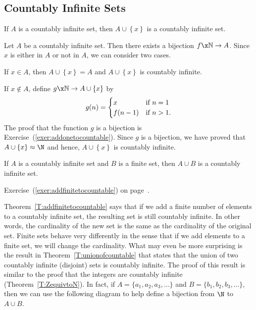\subsection*{Countably Infinite Sets}

\begin{theorem}\label{T:addonetocountable}
If $A$ is a countably infinite set, then $A \cup \left\{ x \right\}$ is a countably infinite set.
\end{theorem}
%
\begin{myproof}
Let $A$ be a  countably infinite set.  Then there exists a bijection $f\x \mathbb{N} \to A$.  Since $x$ is either in $A$ or not in $A$, we can consider two cases.

\newpar
If $x \in A$, then $A \cup \left\{ x \right\} = A$ and $A \cup \left\{ x \right\}$ is countably infinite.

\newpar
If $x \notin A$, define $g\x \mathbb{N} \to A \cup \left\{ x \right\}$ by
\begin{equation} \notag
g( n ) = 
\begin{cases}
x                        &\text{if $n = 1$} \\
f ( n - 1 )   &\text{if $n > 1$.}
\end{cases}
\end{equation}
The proof that the function $g$ is a bijection is Exercise~(\ref{exer:addonetocountable}).  Since $g$ is a bijection, we have proved that $A \cup \left\{ x \right\} \approx \N$ and hence, $A \cup \left\{ x \right\}$ is countably infinite.
\end{myproof}
%
\begin{theorem}\label{T:addfinitetocountable}
If $A$ is a countably infinite set and $B$ is a finite set, then $A \cup B$ is a countably infinite set.
\end{theorem}
%
\begin{myproof}
Exercise~(\ref{exer:addfinitetocountable}) on page~\pageref{exer:addfinitetocountable}.
\end{myproof}
%

Theorem~\ref{T:addfinitetocountable} says that if we add a finite number of elements to a countably infinite set, the resulting set is still countably infinite.  In other words, the cardinality of the new set is the same as the cardinality of the original set.  Finite sets behave very differently in the sense that if we add elements to a finite set, we will change the cardinality.  What may even be more surprising  is the result in Theorem~\ref{T:unionofcountable} that states that the union of two countably infinite (disjoint) sets is countably infinite.  The proof of this result is similar to the proof that the integers are countably infinite  (Theorem~\ref{T:ZequivtoN}).  In fact, if $A = \{a_1, a_2, a_3, \ldots \}$ and $B = \{b_1, b_2, b_3, \ldots \}$, then we can use the following diagram to help define a bijection from $\N$ to $A \cup B$.


